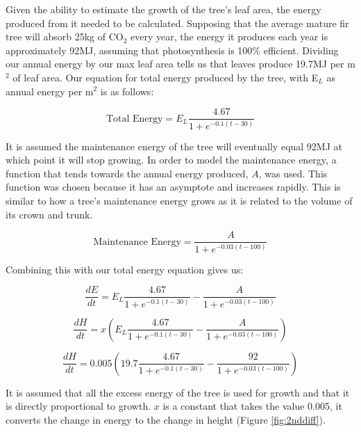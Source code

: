 \documentclass[twocolumn]{article} %
\begin{document}
Given the ability to estimate the growth of the tree’s leaf area, the energy produced from it needed to be calculated. Supposing that the average mature fir tree will absorb 25kg of CO$_2$ every year\cite{seven}, the energy it produces each year is approximately 92MJ, assuming that photosynthesis is 100\% efficient. Dividing our annual energy by our max leaf area tells us that leaves produce 19.7MJ per m$^2$ of leaf area. Our equation for total energy produced by the tree, with E$_L$ as annual energy per m$^2$ is as follows:

\begin{equation}
\label{eq:nine}
    \text{Total Energy} = E_L\frac{4.67}{1+e^{-0.1(t-30)}}
\end{equation}

It is assumed the maintenance energy of the tree will eventually equal 92MJ at which point it will stop growing. In order to model the maintenance energy, a function that tends towards the annual energy produced, $A$, was used. This function was chosen because it has an asymptote and increases rapidly. This is similar to how a tree’s maintenance energy grows as it is related to the volume of its crown and trunk.

\begin{equation}
\label{eq:ten}
    \text{Maintenance Energy} = \frac{A}{1+e^{-0.03(t-100)}}
\end{equation}

Combining this with our total energy equation gives us:

\begin{equation}
\label{eq:eleven}
    \frac{dE}{dt} = E_L\frac{4.67}{1+e^{-0.1(t-30)}} - \frac{A}{1+e^{-0.03(t-100)}}
\end{equation}

\begin{equation}
\label{eq:twelve}
    \frac{dH}{dt} = x(E_L\frac{4.67}{1+e^{-0.1(t-30)}} - \frac{A}{1+e^{-0.03(t-100)}})
\end{equation}

\begin{equation}
\label{eq:thirteen}
    \frac{dH}{dt} = 0.005(19.7\frac{4.67}{1+e^{-0.1(t-30)}} - \frac{92}{1+e^{-0.03(t-100)}})
\end{equation}


It is assumed that all the excess energy of the tree is used for growth and that it is directly proportional to growth. $x$ is a constant that takes the value 0.005, it converts the change in energy to the change in height (Figure \ref{fig:2nddiff}).
\end{document}
